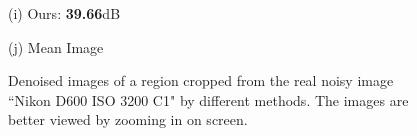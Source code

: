 \documentclass[10pt,onecolumn,letterpaper]{article}
\begin{document}
\begin{figure}[H]
{\begin{minipage}[t]{0.196\textwidth}
{\footnotesize (i) Ours: \textbf{39.66}dB  }
\end{minipage}
\begin{minipage}[t]{0.196\textwidth}
\centering
{}
{\footnotesize (j) Mean Image \cite{crosschannel2016} }
\end{minipage}
}
\caption{Denoised images of a region cropped from the real noisy image ``Nikon D600 ISO 3200 C1" \cite{crosschannel2016} by different methods. The images are better viewed by zooming in on screen.} 
\label{fig13}
\end{figure}
\end{document}
